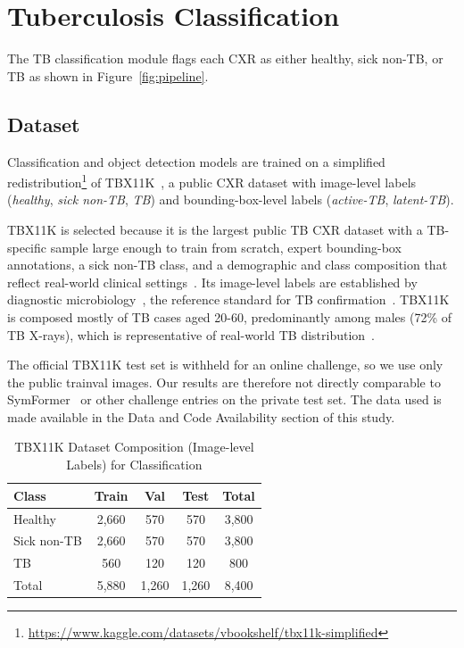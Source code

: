 \documentclass[conference, letterpaper]{IEEEtran}
\begin{document}
\section{Tuberculosis Classification}
\label{sec:tb_classification}

The TB classification module flags each CXR as either healthy, sick non-TB, or TB as shown in Figure~\ref{fig:pipeline}.

\subsection{Dataset}

Classification and object detection models are trained on a simplified redistribution\footnote{\url{https://www.kaggle.com/datasets/vbookshelf/tbx11k-simplified}} of TBX11K~\cite{liu2020tbx11k}, a public CXR dataset with image-level labels (\textit{healthy}, \textit{sick non-TB}, \textit{TB}) and bounding-box-level labels (\textit{active-TB}, \textit{latent-TB}).

TBX11K is selected because it is the largest public TB CXR dataset with a TB-specific sample large enough to train from scratch, expert bounding-box annotations, a sick non-TB class, and a demographic and class composition that reflect real-world clinical settings~\cite{liu2023tbx11k_pami}. Its image-level labels are established by diagnostic microbiology~\cite{liu2023tbx11k_pami}, the reference standard for TB confirmation~\cite{liu2023tbx11k_pami, who_cad_approval_2025}. TBX11K is composed mostly of TB cases aged 20-60, predominantly among males (72\% of TB X-rays), which is representative of real-world TB distribution~\cite{liu2023tbx11k_pami}.

The official TBX11K test set is withheld for an online challenge, so we use only the public trainval images. Our results are therefore not directly comparable to SymFormer~\cite{liu2023tbx11k_pami} or other challenge entries on the private test set. The data used is made available in the Data and Code Availability section of this study.

\begin{table}[!ht]
\renewcommand{\arraystretch}{1.2}
\centering
\begin{threeparttable}
\caption{TBX11K Dataset Composition (Image-level Labels) for Classification}
\label{tab:dataset_composition}
\small
\begin{tabularx}{\columnwidth}{@{}l *{4}{C}@{}}
\toprule
\textbf{Class} & \textbf{Train} & \textbf{Val} & \textbf{Test} & \textbf{Total} \\
\midrule
Healthy        & 2,660 & 570   & 570   & 3,800 \\
Sick non-TB    & 2,660 & 570   & 570   & 3,800 \\
TB             & 560   & 120   & 120   & 800 \\
\midrule
Total          & 5,880 & 1,260 & 1,260 & 8,400 \\
\bottomrule
\end{tabularx}
\end{threeparttable}
\end{table}
\end{document}
